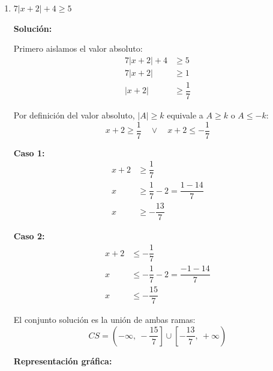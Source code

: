 \documentclass[12pt]{article}
\newcommand{\solucion}{%
    \vspace{0.8em}%
    \textbf{Solución:}%
}
\begin{document}
\begin{enumerate}[label=\alph*.-]
    \newpage
    \item $7|x + 2| + 4 \geq 5$

    \solucion

    Primero aislamos el valor absoluto:
    \begin{align*}
    7|x + 2| + 4 &\geq 5 \\[0.3em]
    7|x + 2| &\geq 1 \\[0.3em]
    |x + 2| &\geq \dfrac{1}{7}
    \end{align*}

    Por definición del valor absoluto, $|A| \geq k$ equivale a $A \geq k$ o $A \leq -k$:
    \[
    x + 2 \geq \dfrac{1}{7} \quad \lor \quad x + 2 \leq -\dfrac{1}{7}
    \]

    \textbf{Caso 1:}
    \begin{align*}
    x + 2 &\geq \dfrac{1}{7} \\[0.3em]
    x &\geq \dfrac{1}{7} - 2 = \dfrac{1 - 14}{7} \\[0.3em]
    x &\geq -\dfrac{13}{7}
    \end{align*}

    \textbf{Caso 2:}
    \begin{align*}
    x + 2 &\leq -\dfrac{1}{7} \\[0.3em]
    x &\leq -\dfrac{1}{7} - 2 = \dfrac{-1 - 14}{7} \\[0.3em]
    x &\leq -\dfrac{15}{7}
    \end{align*}

    El conjunto solución es la unión de ambas ramas:
    \[
    \boxed{CS = \left(-\infty,\ -\dfrac{15}{7}\right] \cup \left[-\dfrac{13}{7},\ +\infty\right)}
    \]

    \textbf{Representación gráfica:}

    \begin{center}
    \end{center}


\end{enumerate}
\end{document}
